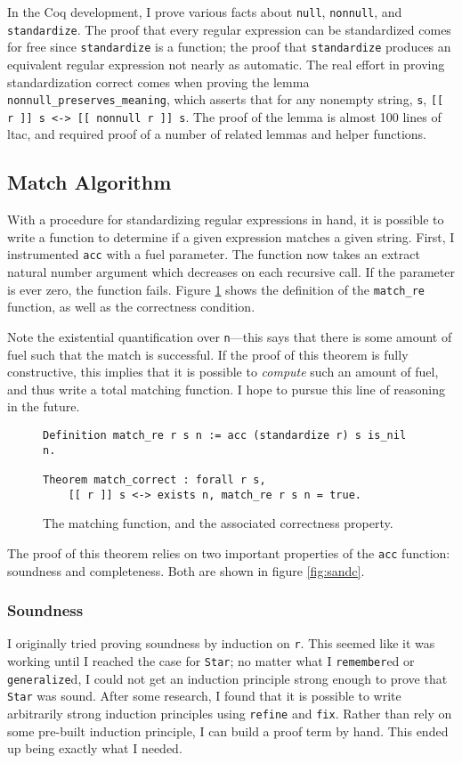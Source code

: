\documentclass{article}
\newcommand{\coq}[1]{\texttt{#1}}
\begin{document}
In the Coq development, I prove various facts about \coq{null}, \coq{nonnull},
and \coq{standardize}. The proof that every regular expression can be
standardized comes for free since \coq{standardize} is a function; the proof
that \coq{standardize} produces an equivalent regular expression not nearly as
automatic. The real effort in proving standardization correct comes when proving
the lemma \coq{nonnull_preserves_meaning}, which asserts that for any nonempty
string, \coq{s}, \coq{[[ r ]] s <-> [[ nonnull r ]] s}. The proof of the lemma
is almost 100 lines of ltac, and required proof of a number of related lemmas
and helper functions.

\subsection{Match Algorithm}
With a procedure for standardizing regular expressions in hand, it is possible
to write a function to determine if a given expression matches a given string.
First, I instrumented \coq{acc} with a fuel parameter. The function now takes an
extract natural number argument which decreases on each recursive call. If the
parameter is ever zero, the function fails. Figure \ref{fig:match} shows the
definition of the \coq{match_re} function, as well as the correctness condition.

Note the existential quantification over \coq{n}---this says that there is some
amount of fuel such that the match is successful. If the proof of this theorem
is fully constructive, this implies that it is possible to \emph{compute} such
an amount of fuel, and thus write a total matching function. I hope to pursue
this line of reasoning in the future.

\begin{figure}
  \centering
\begin{verbatim}
Definition match_re r s n := acc (standardize r) s is_nil n.

Theorem match_correct : forall r s,
    [[ r ]] s <-> exists n, match_re r s n = true.
\end{verbatim}
  \caption{The matching function, and the associated correctness property.}
  \label{fig:match}
\end{figure}

The proof of this theorem relies on two important properties of the \coq{acc}
function: soundness and completeness. Both are shown in figure \ref{fig:sandc}.

\subsubsection{Soundness}
I originally tried proving soundness by induction on \coq{r}. This seemed like
it was working until I reached the case for \coq{Star}; no matter what I
\coq{remember}ed or \coq{generalize}d, I could not get an induction principle
strong enough to prove that \coq{Star} was sound. After some research, I found
that it is possible to write arbitrarily strong induction principles using
\coq{refine} and \coq{fix}. Rather than rely on some pre-built induction
principle, I can build a proof term by hand. This ended up being exactly what I
needed.
\end{document}
